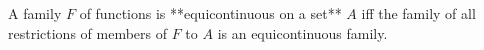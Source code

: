 A family $F$ of functions is **equicontinuous on a set** $A$ iff the family of all restrictions of members of $F$ to $A$ is an equicontinuous family.
